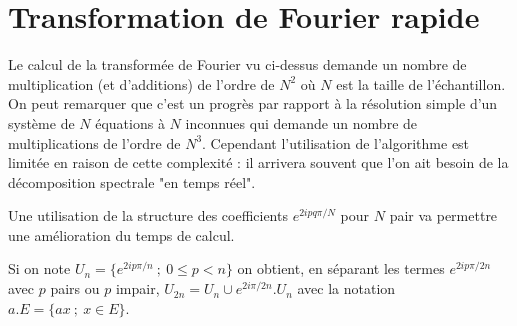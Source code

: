 \section{Transformation de Fourier rapide}
Le calcul de la transformée de Fourier vu ci-dessus demande un nombre de multiplication (et d'additions)  de l'ordre de $N^2$ où $N$ est la taille de l'échantillon. On peut remarquer que c'est un progrès par rapport à la résolution simple d'un système de $N$ équations à $N$ inconnues qui demande un nombre de multiplications de l'ordre de $N^3$. Cependant l'utilisation de l'algorithme est limitée en raison de cette complexité : il arrivera souvent que l'on ait besoin de la décomposition spectrale "en temps réel".

Une utilisation de la structure des coefficients $e^{2ipq\pi/N}$ pour $N$ pair va permettre une amélioration du temps de calcul.

Si on note $U_n = \{e^{2ip\pi/n}\ ;\ 0\le p < n\}$ on obtient, en séparant les termes $e^{2ip\pi/2n}$ avec $p$ pairs ou $p$ impair, $U_{2n} = U_n \cup e^{2i\pi/2n}.U_n$ avec la notation $a.E = \{ax\ ;\ x\in E\}$.

